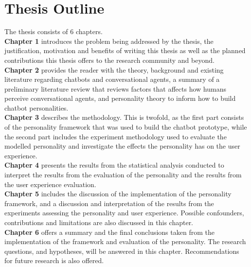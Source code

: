 \vspace{5mm} %

\section{Thesis Outline}

The thesis consists of 6 chapters.\\

\textbf{Chapter 1} introduces the problem being addressed by the thesis, the justification, motivation and benefits of writing this thesis as well as the planned contributions this thesis offers to the research community and beyond.\\

\textbf{Chapter 2} provides the reader with the theory, background and existing literature regarding chatbots and conversational agents, a summary of a preliminary literature review that reviews factors that affects how humans perceive conversational agents, and personality theory to inform how to build chatbot personalities.\\

\textbf{Chapter 3} describes the methodology. This is twofold, as the first part consists of the personality framework that was used to build the chatbot prototype, while the second part includes the experiment methodology used to evaluate the modelled personality and investigate the effects the personality has on the user experience.\\

\textbf{Chapter 4} presents the results from the statistical analysis conducted to interpret the results from the evaluation of the personality and the results from the user experience evaluation.\\

\textbf{Chapter 5} includes the discussion of the implementation of the personality framework, and a discussion and interpretation of the results from the experiments assessing the personality and user experience. Possible confounders, contributions and limitations are also discussed in this chapter.\\

\textbf{Chapter 6} offers a summary and the final conclusions taken from the implementation of the framework and evaluation of the personality. The research questions, and hypotheses, will be answered in this chapter. Recommendations for future research is also offered.\\